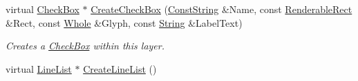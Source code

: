 \begin{DoxyCompactItemize}
virtual \hyperlink{classphys_1_1UI_1_1CheckBox}{CheckBox} $\ast$ \hyperlink{classphys_1_1UI_1_1Layer_aac8bb17722c2a603c40be5cfa7cfe5cc}{CreateCheckBox} (\hyperlink{namespacephys_a5ce5049f8b4bf88d6413c47b504ebb31}{ConstString} \&Name, const \hyperlink{structphys_1_1UI_1_1RenderableRect}{RenderableRect} \&Rect, const \hyperlink{namespacephys_a460f6bc24c8dd347b05e0366ae34f34a}{Whole} \&Glyph, const \hyperlink{namespacephys_aa03900411993de7fbfec4789bc1d392e}{String} \&LabelText)
\begin{DoxyCompactList}\small\item\em Creates a \hyperlink{classphys_1_1UI_1_1CheckBox}{CheckBox} within this layer. \item\end{DoxyCompactList}\item 
\hypertarget{classphys_1_1UI_1_1Layer_a16c50950bb79c8b06a046f2820329728}{
virtual \hyperlink{classphys_1_1UI_1_1LineList}{LineList} $\ast$ \hyperlink{classphys_1_1UI_1_1Layer_a16c50950bb79c8b06a046f2820329728}{CreateLineList} ()}
\label{classphys_1_1UI_1_1Layer_a16c50950bb79c8b06a046f2820329728}


\end{DoxyCompactItemize}
